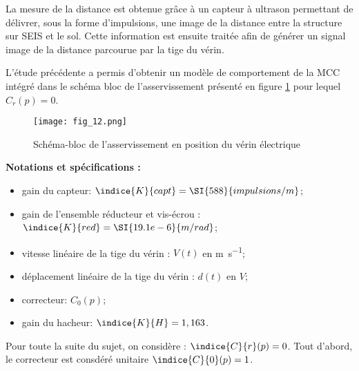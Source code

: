 La mesure de la distance est obtenue grâce à un capteur à ultrason permettant de délivrer, sous la 
forme d’impulsions, une image de la distance entre la structure sur SEIS et le sol. Cette information 
est ensuite traitée afin de générer un signal image de la distance parcourue par la tige du vérin.

L’étude précédente a permis d’obtenir un modèle de comportement de la MCC intégré dans le schéma bloc de l’asservissement présenté en figure \ref{fig_12} pour lequel $C_r(p)=0$.

\begin{figure}[!h]
\centering
\texttt{[image: fig\_12.png]}
\caption{Schéma-bloc de l’asservissement en position du vérin électrique\label{fig_12}}
\end{figure}


\textbf{Notations et spécifications :}
\begin{multicols}{2}
\begin{itemize}
\item gain du capteur: $\indice{K}{capt} = \SI{588}{impulsions/m}$;
\item gain de l’ensemble réducteur et vis-écrou : $\indice{K}{red} = \SI{19.1e-6}{m/rad}$;
\item vitesse linéaire de la tige du vérin : $V(t)$ en \si{m.s^{-1}};
\item déplacement linéaire de la tige du vérin : $d(t)$ en $\si{V}$;
\item correcteur: $C_0(p)$;
\item gain du hacheur: $\indice{K}{H} = 1,163$.
\end{itemize}
\end{multicols}

Pour toute la suite du sujet, on considère : $\indice{C}{r}(p)=0$. Tout d'abord, le correcteur est consdéré unitaire $\indice{C}{0}(p)=1$.



 
